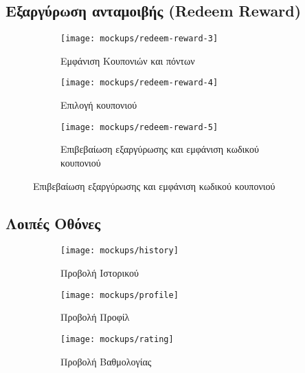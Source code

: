 \newpage

\subsection{Εξαργύρωση ανταμοιβής (Redeem Reward)}

\begin{figure}[H]
    \centering
    \begin{subfigure}[b]{0.3\textwidth}
        \texttt{[image: mockups/redeem-reward-3]}
        \caption{Εμφάνιση Κουπονιών και πόντων}
    \end{subfigure}
    \hfill
    \begin{subfigure}[b]{0.3\textwidth}
        \texttt{[image: mockups/redeem-reward-4]}
        \caption{Επιλογή κουπονιού}
    \end{subfigure}
    \hfill
    \begin{subfigure}[b]{0.3\textwidth}
        \texttt{[image: mockups/redeem-reward-5]}
        \caption{Επιβεβαίωση εξαργύρωσης και εμφάνιση κωδικού κουπονιού}
    \end{subfigure}
\end{figure}

\newpage

\subsection{Λοιπές Οθόνες}

\begin{figure}[H]
    \centering
    \begin{subfigure}[b]{0.3\textwidth}
        \texttt{[image: mockups/history]}
        \caption{Προβολή Ιστορικού}
    \end{subfigure}
    \hfill
    \begin{subfigure}[b]{0.3\textwidth}
        \texttt{[image: mockups/profile]}
        \caption{Προβολή Προφίλ}
    \end{subfigure}
    \hfill
    \begin{subfigure}[b]{0.3\textwidth}
        \texttt{[image: mockups/rating]}
        \caption{Προβολή Βαθμολογίας}
    \end{subfigure}
    \caption{}
\end{figure}



